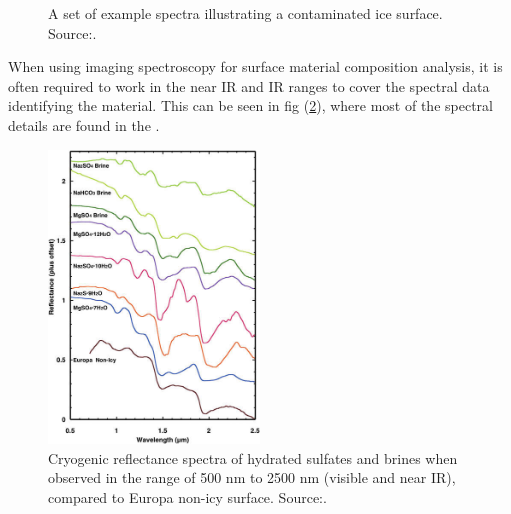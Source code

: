 \begin{figure}[htb]
    \centering
    \captionsetup[subfigure]{width=0.45\textwidth}
    \caption{A set of example spectra illustrating a contaminated ice surface. Source:\cite{negi2015a}.}\label{fig:ice_assessment_spectra2}
\end{figure}
When using imaging spectroscopy for surface material composition analysis, it is often required to work in the near IR and IR ranges to cover the spectral data identifying the material. This can be seen in fig (\ref{fig:material_assessment_spectra}), where most of the spectral details are found in the .
\begin{figure}[htb]
\centering
\includegraphics[width=0.5\textwidth]{figures/Orbiter/surface_assessment_sulfate_brine}
\caption{Cryogenic reflectance spectra of hydrated sulfates and brines when observed in the range of 500 nm to 2500 nm (visible and near IR), compared to Europa non-icy surface. Source:\cite{pappalardo2013a}.}
\label{fig:material_assessment_spectra}
\end{figure}
